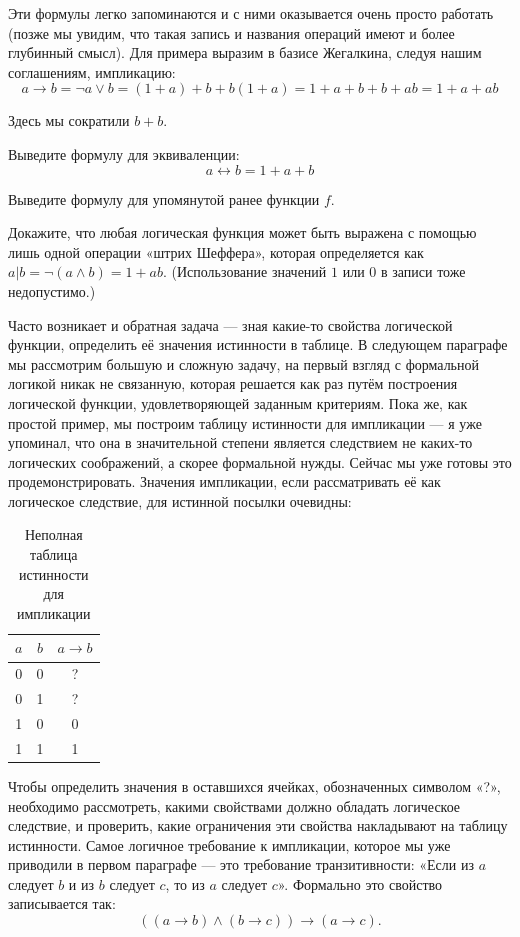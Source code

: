 Эти формулы легко запоминаются и с ними оказывается очень просто работать (позже мы увидим, что такая запись и названия операций имеют и более глубинный смысл). Для примера выразим в базисе Жегалкина, следуя нашим соглашениям, импликацию: $$a \rightarrow b = \neg a \lor b = (1 + a) + b + b(1 + a) = 1 + a + b + b + ab = 1 + a + ab$$

Здесь мы сократили $b+b$.

\begin{exercise} Выведите формулу для эквиваленции: $$a \leftrightarrow b = 1 + a + b$$\end{exercise}

\begin{exercise} Выведите формулу для упомянутой ранее функции $f$.\end{exercise}

\begin{exercise} Докажите, что любая логическая функция может быть выражена с помощью лишь одной операции «штрих Шеффера», которая определяется как $a|b = \neg(a\land b) = 1 + ab$. (Использование значений $1$ или $0$ в записи тоже недопустимо.)\end{exercise}

Часто возникает и обратная задача — зная какие-то свойства логической функции, определить её значения истинности в таблице. В следующем параграфе мы рассмотрим большую и сложную задачу, на первый взгляд с формальной логикой никак не связанную, которая решается как раз путём построения логической функции, удовлетворяющей заданным критериям. Пока же, как простой пример, мы построим таблицу истинности для импликации — я уже упоминал, что она в значительной степени является следствием не каких-то логических соображений, а скорее формальной нужды. Сейчас мы уже готовы это продемонстрировать. Значения импликации, если рассматривать её как логическое следствие, для истинной посылки очевидны:

\begin{table}[h]
\centering
\begin{tabular}{cc|c}
$a$ & $b$ & $a \to b$ \\
\hline
0 & 0 & ? \\
0 & 1 & ? \\
1 & 0 & 0 \\
1 & 1 & 1
\end{tabular}
\caption{Неполная таблица истинности для импликации}
\end{table}

Чтобы определить значения в оставшихся ячейках, обозначенных символом «?», необходимо рассмотреть, какими свойствами должно обладать логическое следствие, и проверить, какие ограничения эти свойства накладывают на таблицу истинности. Самое логичное требование к импликации, которое мы уже приво\-ди\-ли в первом параграфе — это требование транзитивности: \mbox{«Если} из $a$ следует $b$ и из $b$ следует $c$, то из $a$ следует $c$». Формально это свойство записывается так: $$((a\to b) \land (b \to c)) \to (a\to c).$$

